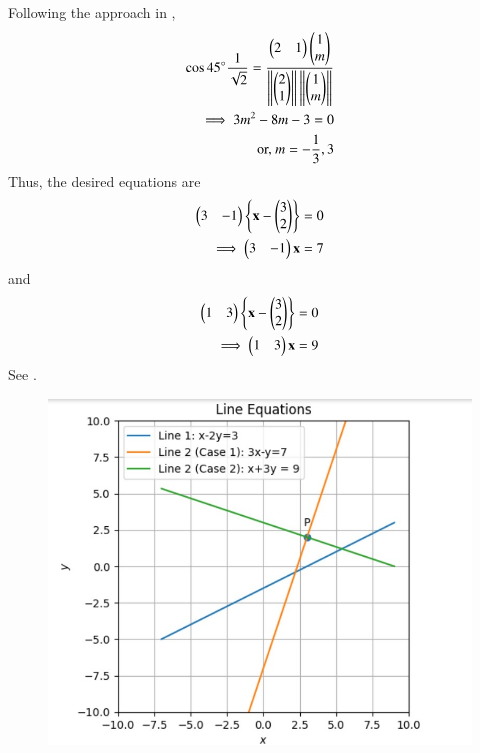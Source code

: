 Following the approach in ,
\begin{align}
\cos45\degree 
\frac{1}{\sqrt{2}} = \frac{\begin{pmatrix}2 & 1\end{pmatrix} \begin{pmatrix}1\\m\end{pmatrix}}{\left\lVert\begin{pmatrix}2\\1\end{pmatrix}\right\rVert\left\lVert\begin{pmatrix}1\\m\end{pmatrix}\right\rVert}
\\
\implies 
 3m^2 - 8m -3 = 0
 \\
\text{or, }
m= - \frac{1}{3}, 3
\end{align} 
Thus, the desired equations are 
\begin{align}
	\begin{pmatrix}3&-1\end{pmatrix}\left\{\mathbf{x}-\begin{pmatrix}3\\2\end{pmatrix}\right\}&=0\\
 \implies 	\begin{pmatrix}3 & -1\end{pmatrix}\mathbf{x} &= 7
\end{align}
and 
\begin{align}
	\begin{pmatrix}1&3\end{pmatrix}\left\{\mathbf{x}-\begin{pmatrix}3\\2\end{pmatrix}\right\}&=0\\
		\implies 	\begin{pmatrix}1 & 3\end{pmatrix}\mathbf{x} &= 9
\end{align}
See
.
\begin{figure}[!ht]
\centering
\includegraphics[width=\columnwidth]{chapters/11/10/4/11/figs/strline.jpg}
\caption{}
\label{fig:chapters/11/10/4/11/figs/strline.jpg}
\end{figure}
